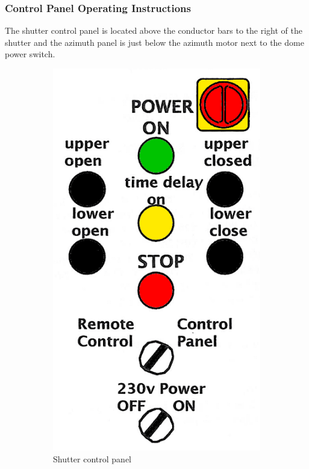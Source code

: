 \documentclass[12pt,titlepage]{article}
\begin{document}
\subsubsection{Control Panel Operating Instructions}

The shutter control panel is located above the conductor bars to the right of the shutter and the azimuth panel is just below the azimuth motor next to the dome power switch.

\begin{figure}[H]
    \centering
    \begin{subfigure}[t]{0.4\textwidth}
        \centering
        \includegraphics[width=.8\textwidth]{./images/dome/shutter_ctrl_panel.png}
        \caption{Shutter control panel}
    \end{subfigure}%
    \begin{subfigure}[t]{0.4\textwidth}

\end{subfigure}
\end{figure}
\end{document}

